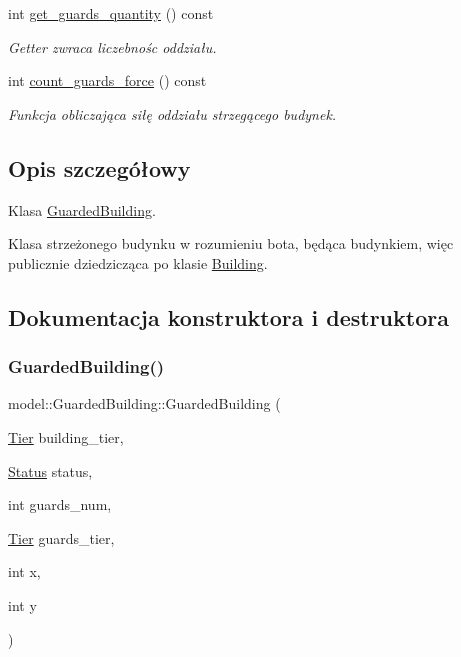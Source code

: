 \begin{DoxyCompactItemize}
int \hyperlink{classmodel_1_1GuardedBuilding_aa06bc4f6b2ab78d37556a1395e6278dc}{get\+\_\+guards\+\_\+quantity} () const
\begin{DoxyCompactList}\small\item\em Getter zwraca liczebnośc oddziału. \end{DoxyCompactList}\item 
\mbox{\label{classmodel_1_1GuardedBuilding_a0bd614b0fa5b050c6226bc1f986b526f}} 
int \hyperlink{classmodel_1_1GuardedBuilding_a0bd614b0fa5b050c6226bc1f986b526f}{count\+\_\+guards\+\_\+force} () const
\begin{DoxyCompactList}\small\item\em Funkcja obliczająca siłę oddziału strzegącego budynek. \end{DoxyCompactList}\end{DoxyCompactItemize}


\subsection{Opis szczegółowy}
Klasa \hyperlink{classmodel_1_1GuardedBuilding}{Guarded\+Building}. 

Klasa strzeżonego budynku w rozumieniu bota, będąca budynkiem, więc publicznie dziedzicząca po klasie \hyperlink{classmodel_1_1Building}{Building}. 

\subsection{Dokumentacja konstruktora i destruktora}
\mbox{\label{classmodel_1_1GuardedBuilding_acd7faa9dc9d87371b33030b6f0223339}} 
\subsubsection{\texorpdfstring{Guarded\+Building()}{GuardedBuilding()}\hspace{0.1cm}{\footnotesize\ttfamily [1/2]}}
{\footnotesize\ttfamily model\+::\+Guarded\+Building\+::\+Guarded\+Building (\begin{DoxyParamCaption}\item[{\hyperlink{tier_8hpp_a50a003ab1ea342f138c038fabfd1ee55}{Tier}}]{building\+\_\+tier,  }\item[{\hyperlink{status_8hpp_a822822ece62ee330ee656034849df887}{Status}}]{status,  }\item[{int}]{guards\+\_\+num,  }\item[{\hyperlink{tier_8hpp_a50a003ab1ea342f138c038fabfd1ee55}{Tier}}]{guards\+\_\+tier,  }\item[{int}]{x,  }\item[{int}]{y }\end{DoxyParamCaption})\hspace{0.3cm}{\ttfamily [inline]}}




